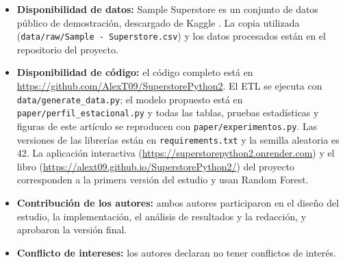 \documentclass[pdflatex,sn-mathphys-num]{sn-jnl}
\begin{document}
\begin{itemize}
\item \textbf{Disponibilidad de datos:} Sample Superstore es un conjunto de datos público de demostración, descargado de Kaggle \cite{superstore}. La copia utilizada (\texttt{data/raw/Sample - Superstore.csv}) y los datos procesados están en el repositorio del proyecto.
\item \textbf{Disponibilidad de código:} el código completo está en \url{https://github.com/AlexT09/SuperstorePython2}. El ETL se ejecuta con \texttt{data/generate\_data.py}; el modelo propuesto está en \texttt{paper/perfil\_estacional.py} y todas las tablas, pruebas estadísticas y figuras de este artículo se reproducen con \texttt{paper/experimentos.py}. Las versiones de las librerías están en \texttt{requirements.txt} y la semilla aleatoria es 42. La aplicación interactiva (\url{https://superstorepython2.onrender.com}) y el libro (\url{https://alext09.github.io/SuperstorePython2/}) del proyecto corresponden a la primera versión del estudio y usan Random Forest.
\item \textbf{Contribución de los autores:} ambos autores participaron en el diseño del estudio, la implementación, el análisis de resultados y la redacción, y aprobaron la versión final.
\item \textbf{Conflicto de intereses:} los autores declaran no tener conflictos de interés.
\end{itemize}


\end{document}
